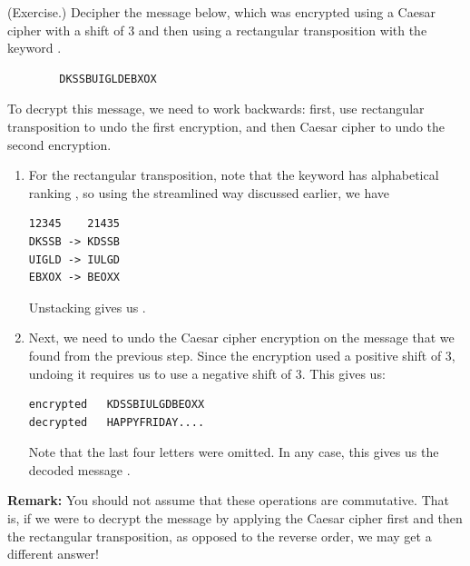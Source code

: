 \documentclass[letterpaper]{article}
\newcommand{\0}{\mathbf{0}}
\begin{document}
\begin{mdframed}
    (Exercise.) Decipher the message below, which was encrypted using a Caesar cipher with a shift of 3 and then using a rectangular transposition with the keyword .
    \begin{verbatim}
        DKSSBUIGLDEBXOX\end{verbatim}

    \begin{mdframed}
        To decrypt this message, we need to work backwards: first, use rectangular transposition to undo the first encryption, and then Caesar cipher to undo the second encryption.
        \begin{enumerate}
            \item For the rectangular transposition, note that the keyword has alphabetical ranking , so using the streamlined way discussed earlier, we have 
            \begin{mdframed}
                \begin{verbatim}
12345    21435
DKSSB -> KDSSB
UIGLD -> IULGD
EBXOX -> BEOXX\end{verbatim}
            \end{mdframed}
            Unstacking gives us .

            \item Next, we need to undo the Caesar cipher encryption on the message that we found from the previous step. Since the encryption used a positive shift of 3, undoing it requires us to use a negative shift of 3. This gives us: 
            \begin{mdframed}
                \begin{verbatim}
encrypted   KDSSBIULGDBEOXX
decrypted   HAPPYFRIDAY....\end{verbatim}
            \end{mdframed}
            Note that the last four letters were omitted. In any case, this gives us the decoded message .
        \end{enumerate}
    \end{mdframed}
\end{mdframed}
\textbf{Remark:} You should not assume that these operations are commutative. That is, if we were to decrypt the message by applying the Caesar cipher first and then the rectangular transposition, as opposed to the reverse order, we may get a different answer!
\end{document}
